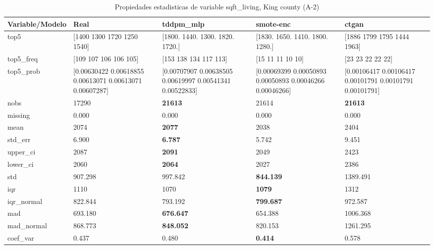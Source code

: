 \begin{table}[H]
\centering
\fontsize{8}{14}\selectfont
\caption{Propiedades  estadisticas de variable sqft\_living, King county (A-2)}
\label{table-stats-king county-a-2-sqft_living}
\begin{tabular}{|l|m{10em}|m{10em}|m{10em}|m{10em}|}
\hline
 \rowcolor[gray]{0.8}
Variable/Modelo & Real & tddpm\_mlp & smote-enc & ctgan \\
\hline top5 & [1400 1300 1720 1250 1540] & [1800. 1440. 1300. 1820. 1720.] & [1830. 1650. 1410. 1800. 1280.] & [1886 1799 1795 1444 1963] \\
\hline top5\_freq & [109 107 106 106 105] & [153 138 134 117 113] & [15 11 11 10 10] & [23 23 22 22 22] \\
\hline top5\_prob & [0.00630422 0.00618855 0.00613071 0.00613071 0.00607287] & [0.00707907 0.00638505 0.00619997 0.00541341 0.00522833] & [0.00069399 0.00050893 0.00050893 0.00046266 0.00046266] & [0.00106417 0.00106417 0.00101791 0.00101791 0.00101791] \\
\hline nobs & 17290 & \bfseries 21613 & \cellcolor[rgb]{0.9, 0.54, 0.52} 21614 & \bfseries 21613 \\
\hline missing & 0.000 & 0.000 & 0.000 & 0.000 \\
\hline mean & 2074 & \bfseries 2077 & 2038 & \cellcolor[rgb]{0.9, 0.54, 0.52} 2404 \\
\hline std\_err & 6.900 & \bfseries 6.787 & 5.742 & \cellcolor[rgb]{0.9, 0.54, 0.52} 9.451 \\
\hline upper\_ci & 2087 & \bfseries 2091 & 2049 & \cellcolor[rgb]{0.9, 0.54, 0.52} 2423 \\
\hline lower\_ci & 2060 & \bfseries 2064 & 2027 & \cellcolor[rgb]{0.9, 0.54, 0.52} 2386 \\
\hline std & 907.298 & 997.842 & \bfseries 844.139 & \cellcolor[rgb]{0.9, 0.54, 0.52} 1389.491 \\
\hline iqr & 1110 & 1070 & \bfseries 1079 & \cellcolor[rgb]{0.9, 0.54, 0.52} 1312 \\
\hline iqr\_normal & 822.844 & 793.192 & \bfseries 799.687 & \cellcolor[rgb]{0.9, 0.54, 0.52} 972.587 \\
\hline mad & 693.180 & \bfseries 676.647 & 654.388 & \cellcolor[rgb]{0.9, 0.54, 0.52} 1006.368 \\
\hline mad\_normal & 868.773 & \bfseries 848.052 & 820.153 & \cellcolor[rgb]{0.9, 0.54, 0.52} 1261.295 \\
\hline coef\_var & 0.437 & 0.480 & \bfseries 0.414 & \cellcolor[rgb]{0.9, 0.54, 0.52} 0.578 \\

\end{tabular}
\end{table}
